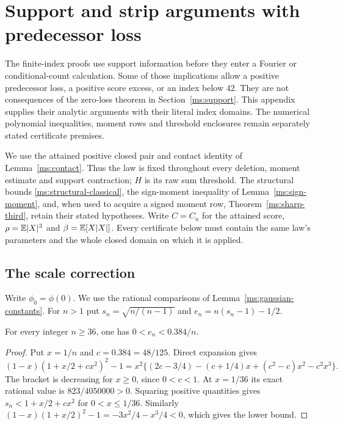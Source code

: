 \section{Support and strip arguments with predecessor loss}
\label{ms:legacy-support:section}

The finite-index proofs use support information before they enter a
Fourier or conditional-count calculation. Some of those implications
allow a positive predecessor loss, a positive score excess, or an index
below $42$. They are not consequences of the zero-loss theorem in
Section~\ref{ms:support}. This appendix supplies their analytic arguments
with their literal index domains. The numerical polynomial inequalities,
moment rows and threshold enclosures remain separately stated certificate
premises.

We use the attained positive closed pair and contact identity of
Lemma~\ref{ms:contact}. Thus the law is fixed throughout every deletion,
moment estimate and support contraction; $H$ is its raw sum threshold.
The structural bounds \eqref{ms:structural-classical}, the sign-moment
inequality of Lemma~\ref{ms:sign-moment}, and, when used to acquire a
signed moment row, Theorem~\ref{ms:sharp-third}, retain their stated
hypotheses. Write $C=C_n$ for the attained score, $\rho=\mathbb E|X|^3$ and
$\beta=\mathbb E[X|X|]$. Every certificate below must contain the same law's
parameters and the whole closed domain on which it is applied.

\subsection{The scale correction}
Write $\phi_0=\phi(0)$.
We use the rational comparisons of Lemma~\ref{ms:gaussian-constants}.
For $n>1$ put $s_n=\sqrt{n/(n-1)}$ and
$e_n=n(s_n-1)-1/2$.
\begin{lemma}\label{ms:legacy-support:scale}
For every integer $n\ge36$, one has $0<e_n<0.384/n$.
\end{lemma}
\begin{proof}
Put $x=1/n$ and $c=0.384=48/125$. Direct expansion gives
\[
 (1-x)(1+x/2+cx^2)^2-1
 =x^2\{(2c-3/4)-(c+1/4)x+(c^2-c)x^2-c^2x^3\}.
\]
The bracket is decreasing for $x\ge0$, since $0<c<1$.
At $x=1/36$ its exact rational value is $823/4050000>0$.
Squaring positive quantities gives
$s_n<1+x/2+cx^2$ for $0<x\le1/36$. Similarly
$(1-x)(1+x/2)^2-1=-3x^2/4-x^3/4<0$, which gives the lower bound.
\end{proof}


